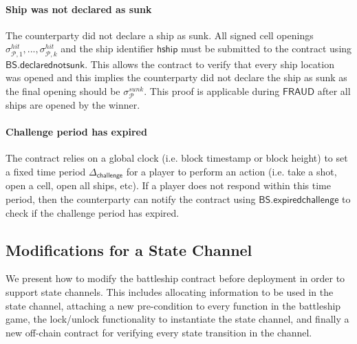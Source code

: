 \documentclass{llncs}
\newcommand{\gamefraud}{\mathsf{FRAUD}}
\newcommand{\hship}{\mathsf{hship}}
\newcommand{\participant}{\mathcal{P}}
\newcommand{\battleshipdeclarednotsunk}{\mathsf{BS.declarednotsunk}}
\newcommand{\battleshipchallengeexpired}{\mathsf{BS.expiredchallenge}}
\newcommand{\timerchallenge}{\mathsf{\Delta}_{\mathsf{challenge}}}
\begin{document}
\paragraph{Ship was not declared as sunk}
The counterparty did not declare a ship as sunk. 
All signed cell openings $\sigma^{hit}_{\participant,1},...,\sigma^{hit}_{\participant,k}$ and the ship identifier $\hship$ must be submitted to the contract using $\battleshipdeclarednotsunk$. 
This allows the contract to verify that every ship location was opened and this implies the counterparty did not declare the ship as sunk as the final opening should be $\sigma^{sunk}_{\participant}$. 
This proof is applicable during $\gamefraud$ after all ships are opened by the winner. 

\paragraph{Challenge period has expired }
The contract relies on a global clock (i.e. block timestamp or block height) to set a fixed time period $\timerchallenge$ for a player to perform an action (i.e. take a shot, open a cell, open all ships, etc). 
If a player does not respond within this time period, then the counterparty can notify the contract using $\battleshipchallengeexpired$  to check if the challenge period has expired. 


\subsection{Modifications for a State Channel}

We present how to modify the battleship contract before deployment in order to support state channels.
This includes allocating information to be used in the state channel, attaching a new pre-condition to every function in the battleship game, the lock/unlock functionality to instantiate the state channel, and finally a new off-chain contract for verifying every state transition in the channel. 
\end{document}
